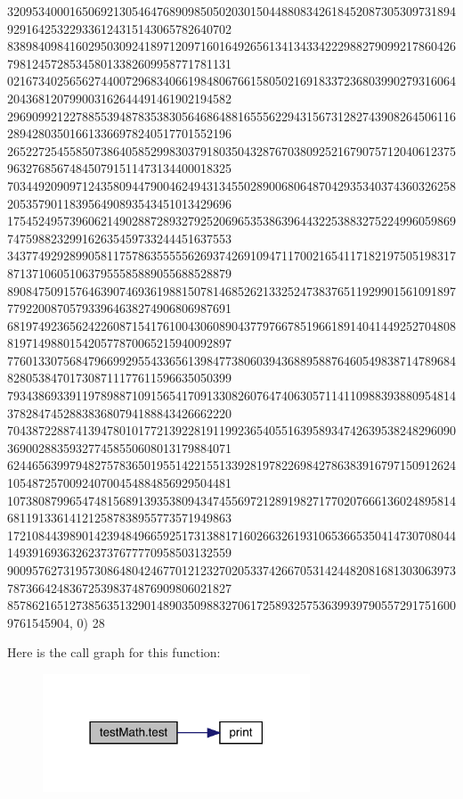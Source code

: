 \begin{DoxyCode}
      320953400016506921305464768909850502030150448808342618452087305309731894929164253229336124315143065782640702
      838984098416029503092418971209716016492656134134334222988279099217860426798124572853458013382609958771781131
      021673402565627440072968340661984806766158050216918337236803990279316064204368120799003162644491461902194582
      296909921227885539487835383056468648816555622943156731282743908264506116289428035016613366978240517701552196
      265227254558507386405852998303791803504328767038092521679075712040612375963276856748450791511473134400018325
      703449209097124358094479004624943134550289006806487042935340374360326258205357901183956490893543451013429696
      175452495739606214902887289327925206965353863964432253883275224996059869747598823299162635459733244451637553
      343774929289905811757863555556269374269109471170021654117182197505198317871371060510637955585889055688528879
      890847509157646390746936198815078146852621332524738376511929901561091897779220087057933964638274906806987691
      681974923656242260871541761004306089043779766785196618914041449252704808819714988015420577870065215940092897
      776013307568479669929554336561398477380603943688958876460549838714789684828053847017308711177611596635050399
      793438693391197898871091565417091330826076474063057114110988393880954814378284745288383680794188843426662220
      704387228874139478010177213922819119923654055163958934742639538248296090369002883593277458550608013179884071
      624465639979482757836501955142215513392819782269842786383916797150912624105487257009240700454884856929504481
      107380879965474815689139353809434745569721289198271770207666136024895814681191336141212587838955773571949863
      172108443989014239484966592517313881716026632619310653665350414730708044149391693632623737677770958503132559
      900957627319573086480424677012123270205337426670531424482081681303063973787366424836725398374876909806021827
      8578621651273856351329014890350988327061725893257536399397905572917516009761545904, 0)
28 \end{DoxyCode}
Here is the call graph for this function\+:\nopagebreak
\begin{figure}[H]
\begin{center}
\leavevmode
\includegraphics[width=225pt]{namespacetest_math_accae4d78fc0739220d35c06c2c0d5822_cgraph}
\end{center}
\end{figure}
